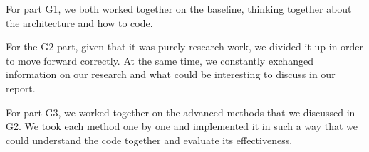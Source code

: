 \documentclass[sigconf]{acmart}
\begin{document}
For part G1, we both worked together on the baseline, thinking together about the architecture and how to code.

For the G2 part, given that it was purely research work, we divided it up in order to move forward correctly. At the same time, we constantly exchanged information on our research and what could be interesting to discuss in our report.

For part G3, we worked together on the advanced methods that we discussed in G2. We took each method one by one and implemented it in such a way that we could understand the code together and evaluate its effectiveness.
\end{document}
